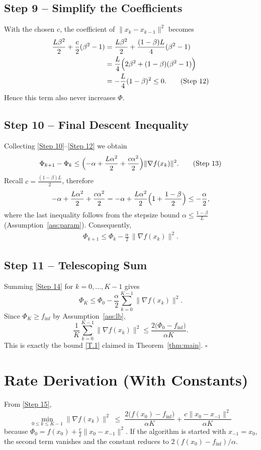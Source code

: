\documentclass{article}
\begin{document}
\subsection*{Step 9 – Simplify the Coefficients}
With the chosen $c$, the coefficient of $\|x_k-x_{k-1}\|^{2}$ becomes
\begin{align}
\frac{L\beta^{2}}{2}+\frac{c}{2}(\beta^{2}-1)
&= \frac{L\beta^{2}}{2}
   +\frac{(1-\beta)L}{4}(\beta^{2}-1) \nonumber\\
&= \frac{L}{4}\Bigl(2\beta^{2}+(1-\beta)(\beta^{2}-1)\Bigr) \nonumber\\
&= -\frac{L}{4}(1-\beta)^{2}\le 0. \tag{Step 12}
\end{align}
Hence this term also never increases $\Phi$.

\subsection*{Step 10 – Final Descent Inequality}
Collecting \eqref{Step 10}–\eqref{Step 12} we obtain
\[
\Phi_{k+1}-\Phi_k
\le
\Bigl(-\alpha+\frac{L\alpha^{2}}{2}+\frac{c\alpha^{2}}{2}\Bigr)
\|\nabla f(x_k)\|^{2}. \tag{Step 13}
\]
Recall $c=\frac{(1-\beta)L}{2}$, therefore
\[
-\alpha+\frac{L\alpha^{2}}{2}+\frac{c\alpha^{2}}{2}
= -\alpha+\frac{L\alpha^{2}}{2}\Bigl(1+\frac{1-\beta}{2}\Bigr)
\le -\frac{\alpha}{2},
\]
where the last inequality follows from the stepsize bound
$\alpha\le\frac{1-\beta}{L}$ (Assumption~\ref{ass:param}).
Consequently,
\begin{align}
\Phi_{k+1}
\le \Phi_k-\frac{\alpha}{2}\,\|\nabla f(x_k)\|^{2}. \tag{Step 14}
\end{align}

\subsection*{Step 11 – Telescoping Sum}
Summing \eqref{Step 14} for $k=0,\dots,K-1$ gives
\[
\Phi_K \le \Phi_0-\frac{\alpha}{2}\sum_{k=0}^{K-1}\|\nabla f(x_k)\|^{2}.
\]
Since $\Phi_K\ge f_{\inf}$ by Assumption~\ref{ass:lb},
\[
\frac{1}{K}\sum_{k=0}^{K-1}\|\nabla f(x_k)\|^{2}
\le \frac{2\bigl(\Phi_0-f_{\inf}\bigr)}{\alpha K}. \tag{Step 15}
\]
This is exactly the bound \eqref{T.1} claimed in Theorem~\ref{thm:main}.
\hfill $\square$

\section*{Rate Derivation (With Constants)}
From \eqref{Step 15},
\[
\boxed{
\min_{0\le k\le K-1}\|\nabla f(x_k)\|^{2}
\;\le\;
\frac{2\bigl(f(x_0)-f_{\inf}\bigr)}{\alpha K}
      +\frac{c\|x_0-x_{-1}\|^{2}}{\alpha K}
}
\]
because $\Phi_0 = f(x_0)+\frac{c}{2}\|x_0-x_{-1}\|^{2}$.
If the algorithm is started with $x_{-1}=x_0$, the second term vanishes
and the constant reduces to $2(f(x_0)-f_{\inf})/\alpha$.
\end{document}
